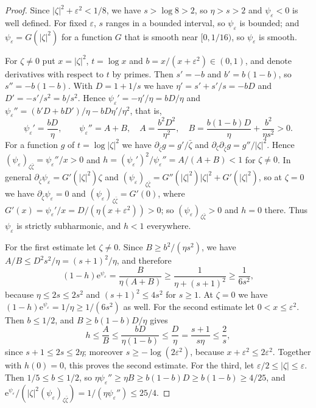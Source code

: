 \begin{proof}
Since $|\zeta|^2+\varepsilon^2<1/8$, we have $s>\log8>2$, so $\eta>s>2$ and $\psi_\varepsilon<0$ is well defined. For fixed $\varepsilon$, $s$ ranges in a bounded interval, so $\psi_\varepsilon$ is bounded; and $\psi_\varepsilon=G(|\zeta|^2)$ for a function $G$ that is smooth near $[0,1/16)$, so $\psi_\varepsilon$ is smooth.

For $\zeta\ne0$ put $x=|\zeta|^2$, $t=\log x$ and $b=x/(x+\varepsilon^2)\in(0,1)$, and denote derivatives with respect to $t$ by primes. Then $s'=-b$ and $b'=b(1-b)$, so $s''=-b(1-b)$. With $D=1+1/s$ we have $\eta'=s'+s'/s=-bD$ and $D'=-s'/s^2=b/s^2$. Hence $\psi_\varepsilon'=-\eta'/\eta=bD/\eta$ and $\psi_\varepsilon''=(b'D+bD')/\eta-bD\eta'/\eta^2$, that is,
\[
 \psi_\varepsilon'=\frac{bD}{\eta},\qquad
 \psi_\varepsilon''=A+B,\quad
 A=\frac{b^2D^2}{\eta^2},\quad
 B=\frac{b(1-b)D}{\eta}+\frac{b^2}{\eta s^2}>0.
\]
For a function $g$ of $t=\log|\zeta|^2$ we have $\partial_{\bar\zeta}g=g'/\bar\zeta$ and $\partial_\zeta\partial_{\bar\zeta}g=g''/|\zeta|^2$. Hence $(\psi_\varepsilon)_{\zeta\bar\zeta}=\psi_\varepsilon''/x>0$ and $h=(\psi_\varepsilon')^2/\psi_\varepsilon''=A/(A+B)<1$ for $\zeta\ne0$. In general $\partial_{\bar\zeta}\psi_\varepsilon=G'(|\zeta|^2)\zeta$ and $(\psi_\varepsilon)_{\zeta\bar\zeta}=G''(|\zeta|^2)|\zeta|^2+G'(|\zeta|^2)$, so at $\zeta=0$ we have $\partial_{\bar\zeta}\psi_\varepsilon=0$ and $(\psi_\varepsilon)_{\zeta\bar\zeta}=G'(0)$, where $G'(x)=\psi_\varepsilon'/x=D/(\eta(x+\varepsilon^2))>0$; so $(\psi_\varepsilon)_{\zeta\bar\zeta}>0$ and $h=0$ there. Thus $\psi_\varepsilon$ is strictly subharmonic, and $h<1$ everywhere.

For the first estimate let $\zeta\ne0$. Since $B\ge b^2/(\eta s^2)$, we have $A/B\le D^2s^2/\eta=(s+1)^2/\eta$, and therefore
\[
 (1-h)\mathrm e^{\psi_\varepsilon}=\frac{B}{\eta(A+B)}
      \ge\frac1{\eta+(s+1)^2}\ge\frac1{6s^2},
\]
because $\eta\le2s\le2s^2$ and $(s+1)^2\le4s^2$ for $s\ge1$. At $\zeta=0$ we have $(1-h)\mathrm e^{\psi_\varepsilon}=1/\eta\ge1/(6s^2)$ as well. For the second estimate let $0<x\le\varepsilon^2$. Then $b\le1/2$, and $B\ge b(1-b)D/\eta$ gives
\[
 h\le\frac AB\le\frac{bD}{\eta(1-b)}\le\frac D\eta=\frac{s+1}{s\eta}\le\frac2s,
\]
since $s+1\le2s\le2\eta$; moreover $s\ge-\log(2\varepsilon^2)$, because $x+\varepsilon^2\le2\varepsilon^2$. Together with $h(0)=0$, this proves the second estimate. For the third, let $\varepsilon/2\le|\zeta|\le\varepsilon$. Then $1/5\le b\le1/2$, so $\eta\psi_\varepsilon''\ge\eta B\ge b(1-b)D\ge b(1-b)\ge4/25$, and $\mathrm e^{\psi_\varepsilon}/(|\zeta|^2(\psi_\varepsilon)_{\zeta\bar\zeta})=1/(\eta\psi_\varepsilon'')\le25/4$.
\end{proof}


